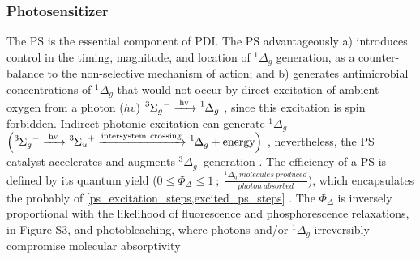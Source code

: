 \subsubsection{Photosensitizer}
The PS is the essential component of PDI. The PS advantageously a) introduces control in the timing, magnitude, and location of $^1\Delta_g$ generation, as a counter-balance to the non-selective mechanism of action; and b) generates antimicrobial concentrations of $^1\Delta_g$ that would not occur by direct excitation of ambient oxygen from a photon ($hv$) $\ce{^3\Sigma_g^- ->[{hv}] ^1\Delta_g}$ \cite{Krasnovsky2012PhotochemicalEnvironment}, since this excitation is spin forbidden. Indirect photonic excitation can generate $^1\Delta_g$ $\left( \ce{^3\Sigma_g^- ->[{hv}] ^3\Sigma_u^+ ->[{intersystem~crossing}] ^1\Delta_g + energy} \right)$ \cite{Long2003SelectionOxygen}, nevertheless, the PS catalyst accelerates and augments $^3\Delta_g^-$ generation \cite{You2018ChemicalOxygen,Schalk2008Near-infraredTetratolyl-porphyrins,Jockusch2008SingletExcitation}. The efficiency of a PS is defined by its quantum yield ($0\le \Phi_{\Delta}\le 1 ~;~ \frac{^1\Delta_g ~molecules ~produced}{photon ~absorbed}$), which encapsulates the probably of \cref{ps_excitation_steps,excited_ps_steps} \cite{Bakalova2004QuantumPhotosensitizers}. The $\Phi_{\Delta}$ is inversely proportional with the likelihood of fluorescence and phosphorescence relaxations, in Figure S3, and photobleaching, where photons and/or $^1\Delta_g$ irreversibly compromise molecular absorptivity \cite{Bonnett2010ChemInformTherapy,Wasser1973TheMetallochlorins}

